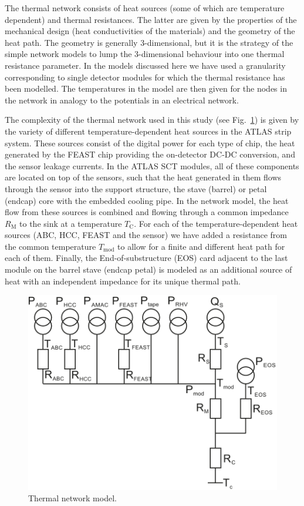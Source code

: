 The thermal network consists of heat sources (some of which are temperature dependent) and thermal resistances. The latter are given by the properties of the mechanical design (heat conductivities of the materials) and the geometry of the heat path. The geometry is generally 3-dimensional, but it is the strategy of the simple network models to lump the 3-dimensional behaviour into one thermal resistance parameter. In the models discussed here we have used a granularity corresponding to single detector modules for which the thermal resistance has been modelled. The temperatures in the model are then given for the nodes in the network in analogy to the potentials in an electrical network.

The complexity of the thermal network used in this study (see Fig.~\ref{fig:thermalmodel}) is given by the variety of different temperature-dependent heat sources in the ATLAS strip system. These sources consist of the digital power for each type of chip, the heat generated by the FEAST chip providing the on-detector DC-DC conversion, and the sensor leakage currents. In the ATLAS SCT modules, all of these components are located on top of the sensors, such that the heat generated in them flows through the sensor into the support structure, the stave (barrel) or petal (endcap) core with the embedded cooling pipe. In the network model, the heat flow from these sources is combined and flowing through a common impedance $R_\text{M}$ to the sink at a temperature $T_\text{C}$. For each of the temperature-dependent heat sources (ABC, HCC, FEAST and the sensor) we have added a resistance from the common temperature $T_\text{mod}$ to allow for a finite and different heat path for each of them. Finally, the End-of-substructure (EOS) card adjacent to the last module on the barrel stave (endcap petal) is modeled as an additional source of heat with an independent impedance for its unique thermal path. 

\begin{figure}[ht]
\centering
\includegraphics[width=0.6\linewidth]{figures/Thermalmodel.pdf}
\caption{Thermal network model.}
\label{fig:thermalmodel}
\end{figure}

